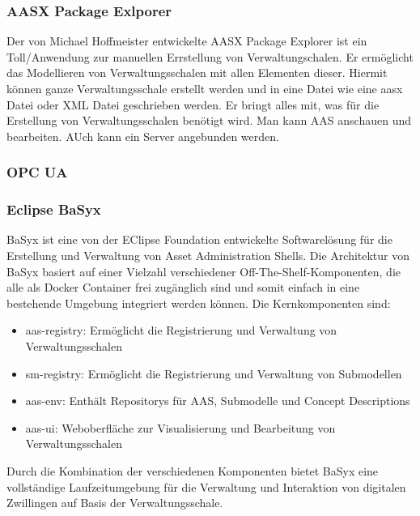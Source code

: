 \subsubsection{AASX Package Exlporer}
Der von Michael Hoffmeister entwickelte AASX Package Explorer ist ein Toll/Anwendung zur manuellen Errstellung von Verwaltungschalen.
Er ermöglicht das Modellieren von Verwaltungsschalen mit allen Elementen dieser.
Hiermit können ganze Verwaltungsschale erstellt werden und in eine Datei wie eine aasx Datei oder XML Datei geschrieben werden.
Er bringt alles mit, was für die Erstellung von Verwaltungsschalen benötigt wird.
Man kann AAS anschauen und bearbeiten.
AUch kann ein Server angebunden werden.
\subsubsection{OPC UA}
\subsubsection{Eclipse BaSyx }
BaSyx ist eine von der EClipse Foundation entwickelte Softwarelösung für die Erstellung und Verwaltung von Asset Administration Shells.
Die Architektur von BaSyx basiert auf einer Vielzahl verschiedener Off-The-Shelf-Komponenten, die alle als Docker Container frei zugänglich sind und somit einfach in eine bestehende Umgebung integriert werden können. 
Die Kernkomponenten sind:

\begin{itemize}
    \item aas-registry: Ermöglicht die Registrierung und Verwaltung von Verwaltungsschalen
    \item sm-registry: Ermöglicht die Registrierung und Verwaltung von Submodellen
    \item aas-env: Enthält Repositorys für AAS, Submodelle und Concept Descriptions
    \item aas-ui: Weboberfläche zur Visualisierung und Bearbeitung von Verwaltungsschalen
\end{itemize}

Durch die Kombination der verschiedenen Komponenten bietet BaSyx eine vollständige Laufzeitumgebung für die Verwaltung und Interaktion von digitalen Zwillingen auf Basis der Verwaltungsschale.



